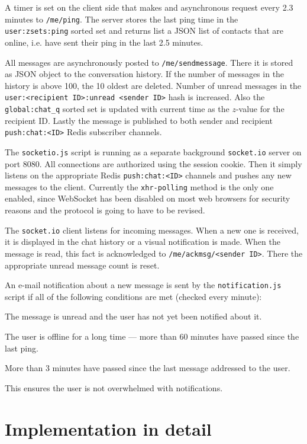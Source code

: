 \documentclass[12pt,oneside]{fithesis}
\begin{document}
	  A timer is set on the client side that makes and asynchronous request every 2.3 minutes to \texttt{/me/ping}. The server stores the last ping time in the \texttt{user:zsets:ping} sorted set and returns list a JSON list of contacts that are online, i.e. have sent their ping in the last 2.5 minutes.
	  
	  All messages are asynchronously posted to \texttt{/me/sendmessage}. There it is stored as JSON object to the conversation history. If the number of messages in the history is above 100, the 10 oldest are deleted. Number of unread messages in the \texttt{user:<recipient ID>:unread <sender ID>} hash is increased. Also the \texttt{global:chat\_q} sorted set is updated with current time as the $z$-value for the recipient ID. Lastly the message is published to both sender and recipient \texttt{push:chat:<ID>} Redis subscriber channels.
	  
	  The \texttt{socketio.js} script is running as a separate background \texttt{socket.io} server on port 8080. All connections are authorized using the session cookie. Then it simply listens on the appropriate Redis \texttt{push:chat:<ID>} channels and pushes any new messages to the client. Currently the \texttt{xhr-polling} method is the only one enabled, since WebSocket has been disabled on most web browsers for security reasons and the protocol is going to have to be revised.
	  
	  The \texttt{socket.io} client listens for incoming messages. When a new one is received, it is displayed in the chat history or a visual notification is made. When the message is read, this fact is acknowledged to \texttt{/me/ackmsg/<sender ID>}. There the appropriate unread message count is reset.
	  
	  An e-mail notification about a new message is sent by the \texttt{notification.js} script if all of the following conditions are met (checked every minute):
	  \begin{compactitem}
	  	\item The message is unread and the user has not yet been notified about it.
	    \item The user is offline for a long time --- more than 60 minutes have passed since the last ping.
	    \item More than 3 minutes have passed since the last message addressed to the user.
	  \end{compactitem}
	  This ensures the user is not overwhelmed with notifications.
\section{Implementation in detail}
\end{document}
